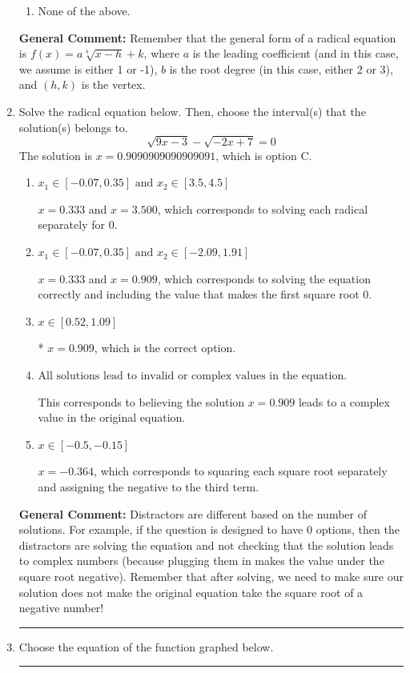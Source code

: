 \documentclass{extbook}[14pt]
\newcommand{\litem}[1]{\item #1

\rule{\textwidth}{0.4pt}}
\begin{document}
\begin{enumerate}
{\begin{enumerate}[label=\Alph*.]
\item None of the above.\end{enumerate}
\textbf{General Comment:} Remember that the general form of a radical equation is $ f(x) = a \sqrt[b]{x - h} + k $, where $a$ is the leading coefficient (and in this case, we assume is either 1 or -1), $b$ is the root degree (in this case, either 2 or 3), and $(h, k)$ is the vertex.
}
\litem{
Solve the radical equation below. Then, choose the interval(s) that the solution(s) belongs to.
\[ \sqrt{9 x - 3} - \sqrt{-2 x + 7} = 0 \]The solution is \( x = 0.9090909090909091 \), which is option C.\begin{enumerate}[label=\Alph*.]
\item \( x_1 \in [-0.07, 0.35] \text{ and } x_2 \in [3.5,4.5] \)

$x = 0.333$ and $x = 3.500$, which corresponds to solving each radical separately for 0.
\item \( x_1 \in [-0.07, 0.35] \text{ and } x_2 \in [-2.09,1.91] \)

$x = 0.333$ and $x = 0.909$, which corresponds to solving the equation correctly and including the value that makes the first square root 0.
\item \( x \in [0.52,1.09] \)

* $x = 0.909$, which is the correct option.
\item \( \text{All solutions lead to invalid or complex values in the equation.} \)

This corresponds to believing the solution $x = 0.909$ leads to a complex value in the original equation.
\item \( x \in [-0.5,-0.15] \)

$x = -0.364$, which corresponds to squaring each square root separately and assigning the negative to the third term.
\end{enumerate}

\textbf{General Comment:} Distractors are different based on the number of solutions. For example, if the question is designed to have 0 options, then the distractors are solving the equation and not checking that the solution leads to complex numbers (because plugging them in makes the value under the square root negative). Remember that after solving, we need to make sure our solution does not make the original equation take the square root of a negative number!
}
\litem{
Choose the equation of the function graphed below.

}
\end{enumerate}
\end{document}
